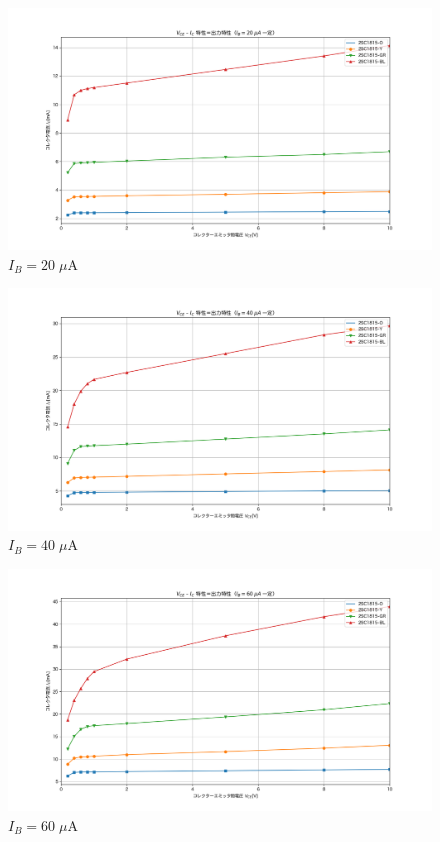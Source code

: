 \documentclass[uplatex,a4paper,11pt,oneside,openany]{jsbook}
\begin{document}
\newpage

\begin{figure}[H]
  \centering
   \includegraphics[keepaspectratio, scale=0.48, angle=0]
               {figs/png/staticE01Ib20.png}
               \caption{$I_B=20\;\mu$A}
               \label{fig:ex011}
\end{figure}

\begin{figure}[H]
  \centering
   \includegraphics[keepaspectratio, scale=0.48, angle=0]
             {figs/png/staticE01Ib40.png}
             \caption{$I_B=40\;\mu$A}
             \label{fig:ex012}
\end{figure}

\newpage

\begin{figure}[H]
  \centering
   \includegraphics[keepaspectratio, scale=0.48, angle=0]
               {figs/png/staticE01Ib60.png}
               \caption{$I_B=60\;\mu$A}
               \label{fig:ex013}
\end{figure}
\end{document}

